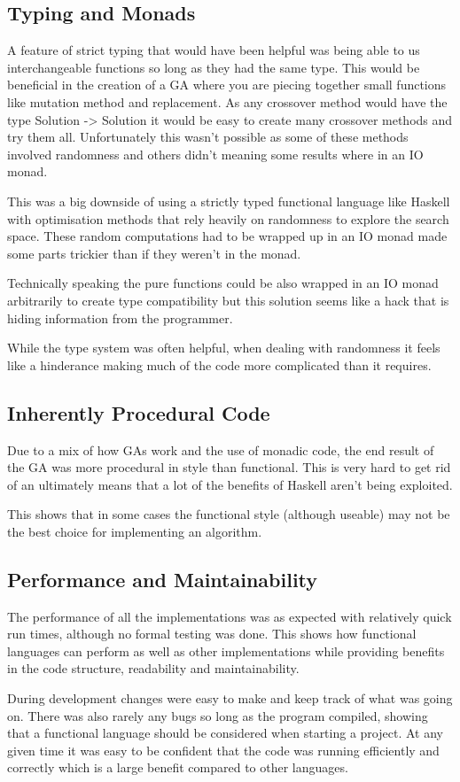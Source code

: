 \documentclass[a4paper]{article}
\begin{document}
\subsection{Typing and Monads}
A feature of strict typing that would have been helpful was being able to us interchangeable functions so long as they had the same type.
This would be beneficial in the creation of a GA where you are piecing together small functions like mutation method and replacement.
As any crossover method would have the type Solution -> Solution it would be easy to create many crossover methods and try them all.
Unfortunately this wasn't possible as some of these methods involved randomness and others didn't meaning some results where in an IO monad.
\par
This was a big downside of using a strictly typed functional language like Haskell with optimisation methods that rely heavily on randomness to explore the search space.
These random computations had to be wrapped up in an IO monad made some parts trickier than if they weren't in the monad.
\par
Technically speaking the pure functions could be also wrapped in an IO monad arbitrarily to create type compatibility but this solution seems like a hack that is hiding information from the programmer.
\par
While the type system was often helpful, when dealing with randomness it feels like a hinderance making much of the code more complicated than it requires.

\subsection{Inherently Procedural Code}
Due to a mix of how GAs work and the use of monadic code, the end result of the GA was more procedural in style than functional.
This is very hard to get rid of an ultimately means that a lot of the benefits of Haskell aren't being exploited.
\par
This shows that in some cases the functional style (although useable) may not be the best choice for implementing an algorithm.

\subsection{Performance and Maintainability}
The performance of all the implementations was as expected with relatively quick run times, although no formal testing was done.
This shows how functional languages can perform as well as other implementations while providing benefits in the code structure, readability and maintainability.
\par
During development changes were easy to make and keep track of what was going on.
There was also rarely any bugs so long as the program compiled, showing that a functional language should be considered when starting a project.
At any given time it was easy to be confident that the code was running efficiently and correctly which is a large benefit compared to other languages.
\end{document}

